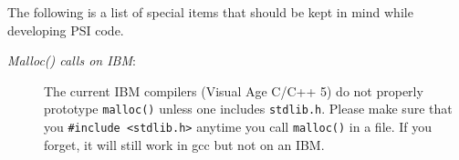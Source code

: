 % 
%
%
%
%

The following is a list of special items that should be kept in mind
while developing PSI code.

\begin{description}
\item [{\em Malloc() calls on IBM}:] The current IBM compilers (Visual Age
  C/C++ 5) do not properly prototype {\tt malloc()} unless one includes
  {\tt stdlib.h}.  Please make sure that you {\tt \#include <stdlib.h>}
  anytime you call {\tt malloc()} in a file.  If you forget, it will
  still work in gcc but not on an IBM.
\end{description}

